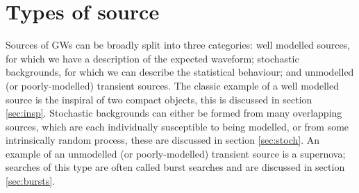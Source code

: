 \section{Types of source}\label{sec:voc}

Sources of GWs can be broadly split into three categories: well modelled sources, for which we have a description of the expected waveform; stochastic backgrounds, for which we can describe the statistical behaviour; and unmodelled (or poorly-modelled) transient sources. The classic example of a well modelled source is the inspiral of two compact objects, this is discussed in section \ref{sec:insp}. Stochastic backgrounds can either be formed from many overlapping sources, which are each individually susceptible to being modelled, or from some intrinsically random process, these are discussed in section \ref{sec:stoch}. An example of an unmodelled (or poorly-modelled) transient source is a supernova; searches of this type are often called burst searches and are discussed in section \ref{sec:bursts}.

